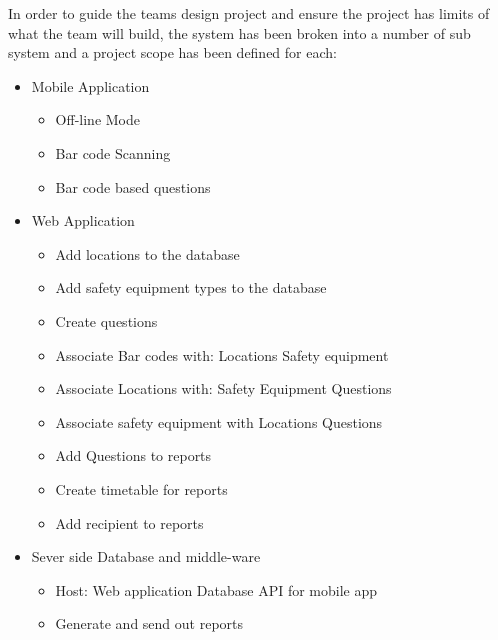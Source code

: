 \documentclass[Letter,11pt]{article}
\begin{document}
	In order to guide the teams design project and ensure the project has limits of what the team will build, the system has been broken into a number of sub system 
	and a project scope has been defined for each:
		\begin{itemize}
			\item Mobile Application
			\begin{itemize}
				\item Off-line Mode
				\item Bar code Scanning
				\item Bar code based questions
			\end{itemize}
			\item Web Application
			\begin{itemize}
				\item Add locations to the database
				\item Add safety equipment types to the database
				\item Create questions
				\item Associate Bar codes with:
				\subitem Locations
				\subitem Safety equipment
				\item Associate Locations with:
				\subitem Safety Equipment
				\subitem Questions
				\item Associate safety equipment with
				\subitem Locations
				\subitem Questions
				\item Add Questions to reports
				\item Create timetable for reports
				\item Add recipient to reports
			\end{itemize}
			\item Sever side Database and middle-ware
			\begin{itemize}
				\item Host:
				\subitem Web application
				\subitem Database API for mobile app
				\item Generate and send out reports
			\end{itemize}
		\end{itemize}
\end{document}

